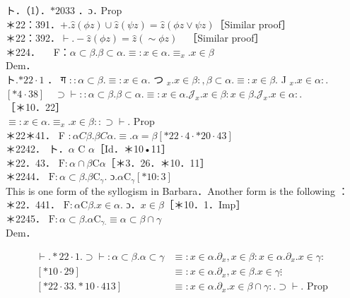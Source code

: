 \documentclass[10pt]{article}
\begin{document}
ト．（1）．$* 2033$ ．ɔ․ Prop\\
＊22：391．$+. \hat{z}(\phi z) \cup \hat{z}(\psi z)=\hat{z}(\phi z \vee \psi z)$［Similar proof］\\
＊22：392．$\vdash .-\hat{z}(\phi z)=\hat{z}(\sim \phi z) \quad$［Similar proof］\\
＊224．$\quad$ F：$\alpha \subset \beta . \beta \subset \alpha . \equiv: x \in \alpha . \equiv_{x} . x \in \beta$\\
Dem．\\
ト.$* 22 \cdot 1$ ． ग $:: \alpha \subset \beta . \equiv: x \in \alpha$. つ $_{x} . x \in \beta:, \beta \subset \alpha . \equiv: x \in \beta$. J $_{x} . x \in \alpha:$.\\
$[* 4 \cdot 38] \quad \supset \vdash:: \alpha \subset \beta . \beta \subset \alpha . \equiv: x \in \alpha . \mathcal{J}_{x} . x \in \beta: x \in \beta . \mathcal{J}_{x} . x \in \alpha:$.\\
［＊10．22］\\
$\equiv: x \in \alpha . \equiv_{x} . x \in \beta:: \supset \vdash$. Prop\\
＊22＊41． F $: \alpha C \beta . \beta C \alpha . \equiv . \alpha=\beta[* 22 \cdot 4 \cdot * 20 \cdot 43]$\\
＊2242． ト．$\alpha$ C $\alpha$［Id．＊10•11］\\
＊22．43． $\mathrm{F}: \alpha \cap \beta \mathrm{C} \alpha$［＊3．26．＊10．11］\\
＊2244． $\mathrm{F}: \alpha \subset \beta . \beta \mathrm{C}_{\gamma}$. ɔ.$\alpha \mathrm{C}_{\gamma}[* 10: 3]$\\
This is one form of the syllogism in Barbara．Another form is the following ：\\
＊22．441． $\mathrm{F}: \alpha \mathrm{C} \beta . x \in \alpha$. ɔ．$x \in \beta$［＊10．1．Imp］\\
＊2245． $\mathrm{F}: \alpha \subset \beta . \alpha \mathrm{C}_{\gamma .} \equiv \alpha \subset \beta \cap \gamma$\\
Dem．

$$
\begin{aligned}
\vdash . * 22 \cdot 1 . \supset \vdash: \alpha \subset \beta . \alpha \subset \gamma & \equiv: x \in \alpha . \partial_{x}, x \in \beta: x \in \alpha . \partial_{x} . x \in \gamma: \\
{[* 10 \cdot 29] } & \equiv: x \in \alpha . \partial_{x}, x \in \beta . x \in \gamma \vdots \\
{[* 22 \cdot 33 . * 10 \cdot 413] } & \equiv: x \in \alpha . \partial_{x} . x \in \beta \cap \gamma: . \supset \vdash . \text { Prop }
\end{aligned}
$$
\end{document}
